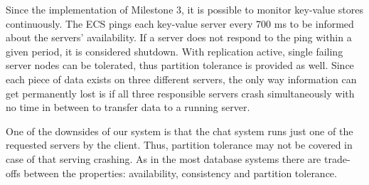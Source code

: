 Since the implementation of Milestone 3, it is possible to monitor key-value stores continuously. The ECS pings each key-value server every 700 ms to be informed about the servers’ availability. If a server does not respond to the ping within a given period, it is considered shutdown. With replication active, single failing server nodes can be tolerated, thus partition tolerance is provided as well. Since each piece of data exists on three different servers, the only way information can get permanently lost is if all three responsible servers crash simultaneously with no time in between to transfer data to a running server.

One of the downsides of our system is that the chat system runs just one of the requested servers by the client. Thus, partition tolerance may not be covered in case of that serving crashing. As in the most database systems there are trade-offs between the properties: availability, consistency and partition tolerance.




